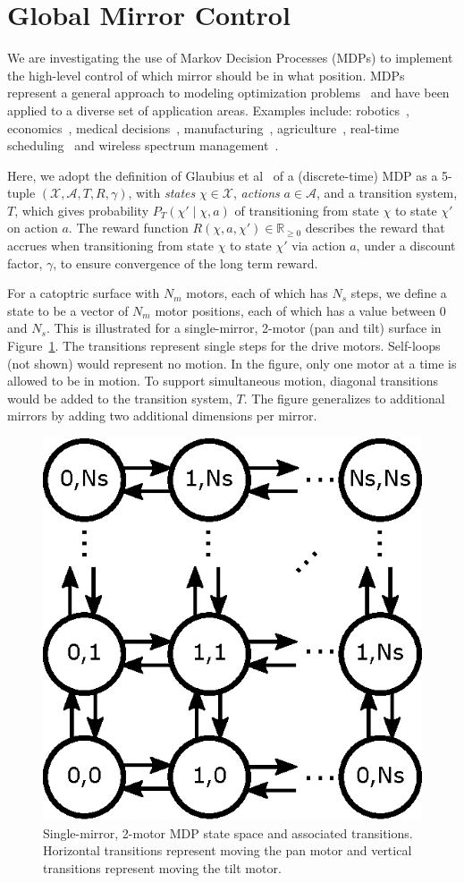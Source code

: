 \section{Global Mirror Control}
\label{sec:mdp}

We are investigating the use of Markov Decision Processes (MDPs) to
implement the high-level control of which mirror should be in what position.
MDPs represent a general approach to modeling optimization
problems~\cite{puterman} and have been applied to a diverse set of
application areas. Examples include: robotics~\cite{ab10},
economics~\cite{bs98}, %
medical decisions~\cite{ahsr10}, manufacturing~\cite{yyl04},
agriculture~\cite{Kristensen03},
real-time scheduling~\cite{gtsg08}
and wireless spectrum management~\cite{mgc16}.

Here, we adopt the definition of Glaubius et al~\cite{gtsg08}
of a (discrete-time) MDP as a 5-tuple
$(\mathcal{X}, \mathcal{A}, T, R, \gamma)$, with \emph{states}
$\chi \in \mathcal{X}$, \emph{actions} $a \in \mathcal{A}$,
and a transition system, $T$, which gives probability
$P_T (\chi' \mid \chi, a)$ of transitioning from state $\chi$ to
state $\chi'$ on action $a$.
The reward function $R(\chi, a, \chi') \in \mathbb R_{\ge 0}$ describes the
reward that accrues when transitioning from state $\chi$ to
state $\chi'$ via action $a$, under a discount factor, $\gamma$,
to ensure convergence of the long term reward.

For a catoptric surface with $N_m$ motors, each of which has $N_s$
steps, we define a state to be a vector of $N_m$ motor positions,
each of which has a value between 0 and $N_s$.  This is illustrated
for a single-mirror, 2-motor (pan and tilt) surface in Figure~\ref{fig:mdp2}.
The transitions represent single steps for the drive motors.
Self-loops (not shown) would represent no motion.  In the figure,
only one motor at a time is allowed to be in motion.  To support simultaneous
motion, diagonal transitions would be added to the transition system, $T$.
The figure generalizes to additional mirrors by adding two
additional dimensions per mirror.

\begin{figure}[ht]
\includegraphics[width=0.5\columnwidth]{mdp2}
\caption{Single-mirror, 2-motor MDP state space and associated transitions.
Horizontal transitions represent moving the pan motor and vertical transitions
represent moving the tilt motor.}
\label{fig:mdp2}
\end{figure}

